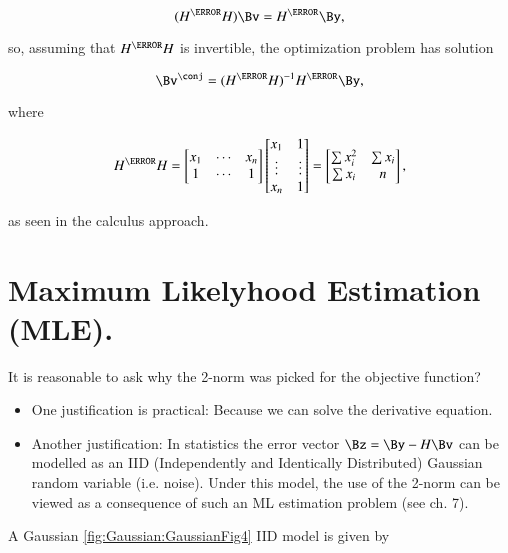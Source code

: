 \begin{dmath}\label{eqn:L1introduction:300}
(H^\T H) \Bv = H^\T \By,
\end{dmath}

so, assuming that \( H^\T H \) is invertible, the optimization problem has solution

\begin{dmath}\label{eqn:L1introduction:320}
\Bv^\conj =
(H^\T H)^{-1} H^\T \By,
\end{dmath}

where

\begin{dmath}\label{eqn:L1introduction:340}
H^\T H
=
\begin{bmatrix}
x_1 & \cdots & x_n \\
 1  & \cdots & 1   \\
\end{bmatrix}
\begin{bmatrix}
x_1 & 1 \\
\vdots & \vdots \\
x_n & 1
\end{bmatrix}
=
\begin{bmatrix}
\sum x_i^2 & \sum x_i \\
\sum x_i & n
\end{bmatrix}
,
\end{dmath}

as seen in the calculus approach.

\section{Maximum Likelyhood Estimation (MLE).}

It is reasonable to ask why the 2-norm was picked for the objective function?

\begin{itemize}
\item One justification is practical: Because we can solve the derivative equation.
\item Another justification: In statistics the error vector \( \Bz = \By - H \Bv \) can be modelled as an IID (Independently and Identically Distributed) Gaussian random variable (i.e. noise).  Under this model, the use of the 2-norm can be viewed as a consequence of such an ML estimation problem (see \citep{boyd2004convex} ch. 7).
\end{itemize}

A Gaussian \cref{fig:Gaussian:GaussianFig4} IID model is given by

